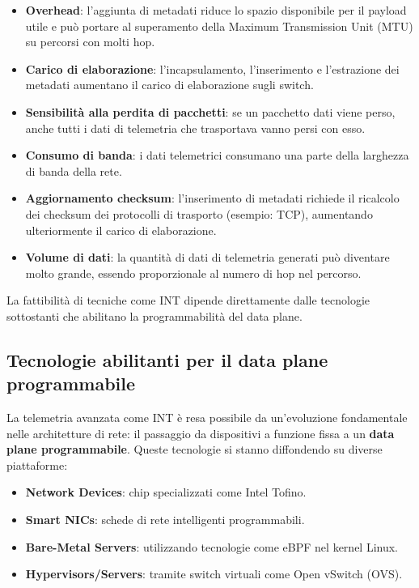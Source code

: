 \begin{itemize}
\item \textbf{Overhead}: l'aggiunta di metadati riduce lo spazio disponibile
per il payload utile e può portare al superamento della Maximum Transmission
Unit (MTU) su percorsi con molti hop.
\item \textbf{Carico di elaborazione}: l'incapsulamento, l'inserimento e
l'estrazione dei metadati aumentano il carico di elaborazione sugli switch.
\item \textbf{Sensibilità alla perdita di pacchetti}: se un pacchetto dati
viene perso, anche tutti i dati di telemetria che trasportava vanno persi
con esso.
\item \textbf{Consumo di banda}: i dati telemetrici consumano una parte della
larghezza di banda della rete.
\item \textbf{Aggiornamento checksum}: l'inserimento di metadati richiede il
ricalcolo dei checksum dei protocolli di trasporto (esempio: TCP), aumentando
ulteriormente il carico di elaborazione.
\item \textbf{Volume di dati}: la quantità di dati di telemetria generati può
diventare molto grande, essendo proporzionale al numero di hop nel percorso.
\end{itemize}

La fattibilità di tecniche come INT dipende direttamente dalle tecnologie
sottostanti che abilitano la programmabilità del data plane.

\subsection{Tecnologie abilitanti per il data plane programmabile}

La telemetria avanzata come INT è resa possibile da un'evoluzione fondamentale
nelle architetture di rete: il passaggio da dispositivi a funzione fissa a
un \textbf{data plane programmabile}. Queste tecnologie si stanno diffondendo
su diverse piattaforme:

\begin{itemize}
\item \textbf{Network Devices}: chip specializzati come Intel Tofino.
\item \textbf{Smart NICs}: schede di rete intelligenti programmabili.
\item \textbf{Bare-Metal Servers}: utilizzando tecnologie come eBPF nel
kernel Linux.
\item \textbf{Hypervisors/Servers}: tramite switch virtuali come
Open vSwitch (OVS).
\end{itemize}

